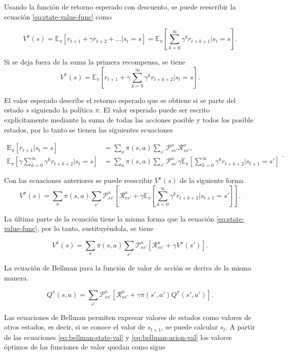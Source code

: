 Usando la función de retorno esperado con descuento, se puede
reescribir la ecuación \ref{eq:state-value-func} como

\[
V^\pi(s) = \mathbb{E}_\pi[r_{t+1} + \gamma r_{t+2} + \dots | s_t = s] = \mathbb{E}_{\pi}[\sum_{k = 0}^\infty \gamma^{k} r_{t+k+1} | s_t =s].
\]


Si se deja fuera de la suma la primera recompensa, se tiene
\[
V^\pi(s) = \mathbb{E}_\pi[r_{t+1} + \gamma \sum_{k = 0}^\infty \gamma^{k} r_{t+k+2} | s_t =s].
\]

El valor esperado describe el retorno esperado que se obtiene si se parte del estado $s$ siguiendo la política $\pi$.
El valor esperado puede ser escrito explícitamente mediante la suma de todas
las acciones posible y todos los posible estados, por lo tanto se tienen las siguientes ecuaciones

\[
\begin{split}
\mathrm{E}_\pi[r_{t+1}| s_t=s] &= \sum_a \pi(s,a) \sum_{s'}\mathcal{P}_{ss'}^a\mathcal{R}_{ss'}^a,\\
\mathbb{E}_\pi[\gamma \sum_{k = 0}^\infty \gamma^{k} r_{t+k+2} | s_t =s] &=
\sum_a \pi(s,a) \sum_{s'}\mathcal{P}_{ss'}^a \gamma \mathbb{E}_\pi[\sum_{k = 0}^\infty \gamma^{k} r_{t+k+2} | s_{t+1} = s']
\end{split}.
\]

Con las ecuaciones anteriores se puede reescribir $V^\pi(s)$ de la
siguiente forma
\[
V^\pi(s) = \sum_a \pi(s,a) \sum_{s'}\mathcal{P}_{ss'}^a [\mathcal{R}_{ss'}^a +
\gamma \mathbb{E}_\pi[\sum_{k = 0}^\infty \gamma^{k} r_{t+k+2} | s_{t+1} = s']].
\]

La última parte de la ecuación tiene
la misma forma que la ecuación \ref{eq:state-value-func}, por lo tanto, sustituyéndola, se tiene

\begin{equation}\label{eq:bellman-state-val}
    V^\pi(s) = \sum_a \pi(s,a) \sum_{s'}\mathcal{P}_{ss'}^a [\mathcal{R}_{ss'}^a + \gamma V^\pi(s')].
\end{equation}

La ecuación de Bellman para la función de valor de acción se deriva de la misma manera.

\begin{equation}\label{eq:bellman-acion-val}
    Q^\pi(s, a) = \sum_{s'}\mathcal{P}_{ss'}^a [\mathcal{R}_{ss'}^a + \gamma \pi(s',a')Q^\pi(s', a')].
\end{equation}

Las ecuaciones de Bellman permiten expresar valores de estados como
valores de otros estados, es decir, si se conoce el valor de $s_{t+1}$, se puede calcular $s_t$. A partir de las ecuaciones \ref{eq:bellman-state-val} y \ref{eq:bellman-acion-val} los valores óptimos de
las funciones de valor quedan como sigue

